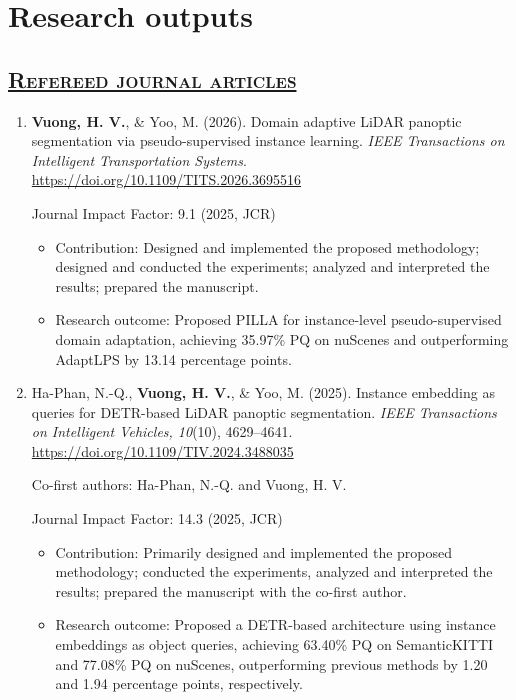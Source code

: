 \documentclass[a4paper,12pt]{article}
\begin{document}
\section{\textbf{Research outputs}}
\vspace{0.5mm}

\subsection*{\scshape\underline{Refereed journal articles}}
\begin{enumerate}[
    leftmargin=*,
    labelsep=0.5em,
    align=left
]

  \item
  \textbf{Vuong, H. V.}, \& Yoo, M. (2026).
  Domain adaptive LiDAR panoptic segmentation via pseudo-supervised instance learning.
  \textit{IEEE Transactions on Intelligent Transportation Systems}.
  \href{https://doi.org/10.1109/TITS.2026.3695516}
  {https://doi.org/10.1109/TITS.2026.3695516}

  Journal Impact Factor: 9.1 (2025, JCR)

  \begin{itemize}[leftmargin=1.5em]
      \item Contribution: Designed and implemented the proposed methodology; designed and conducted the experiments; analyzed and interpreted the results; prepared the manuscript.
      \item Research outcome: Proposed PILLA for instance-level pseudo-supervised domain adaptation, achieving 35.97\% PQ on nuScenes and outperforming AdaptLPS by 13.14 percentage points.
  \end{itemize}


  \item
  Ha-Phan, N.-Q., \textbf{Vuong, H. V.}, \& Yoo, M. (2025).
  Instance embedding as queries for DETR-based LiDAR panoptic segmentation.
  \textit{IEEE Transactions on Intelligent Vehicles, 10}(10), 4629--4641.
  \href{https://doi.org/10.1109/TIV.2024.3488035}
  {https://doi.org/10.1109/TIV.2024.3488035}

  Co-first authors: Ha-Phan, N.-Q. and Vuong, H. V.

  Journal Impact Factor: 14.3 (2025, JCR)

\begin{itemize}[leftmargin=1.5em]

    \item Contribution: Primarily designed and implemented the proposed methodology; conducted the experiments, analyzed and interpreted the results; prepared the manuscript with the co-first author.
    \item Research outcome: Proposed a DETR-based architecture using instance embeddings as object queries, achieving 63.40\% PQ on SemanticKITTI and 77.08\% PQ on nuScenes, outperforming previous methods by 1.20 and 1.94 percentage points, respectively.
\end{itemize}



\end{enumerate}
\end{document}

